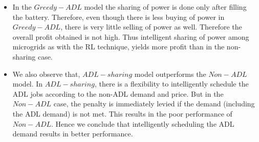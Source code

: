 \begin{itemize}

\item In the $Greedy-ADL$ model the sharing of power is done only after filling the battery. Therefore, even though there is less buying of power in $Greedy-ADL$, there is very little selling of power as well. Therefore the overall profit obtained is not high. Thus intelligent sharing of power among microgrids as with the RL technique, yields more profit than in the non-sharing case. 

\item We also observe that, $ADL-sharing$ model outperforms the $Non-ADL$ model. In $ADL-sharing$, there is a flexibility to intelligently schedule the ADL jobs according to the non-ADL demand and price. But in the $Non-ADL$ case, the penalty is immediately levied if the demand (including the ADL demand) is not met. This results in the poor performance of $Non-ADL$. Hence we conclude that intelligently scheduling the ADL demand results in better performance.



	

\end{itemize}
